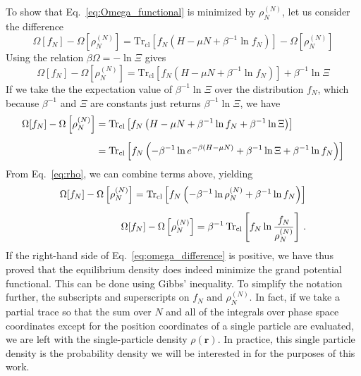 \documentclass{report}
\newcommand{\trace}{\operatorname{Tr_{cl}}}
\begin{document}
To show that Eq.~\ref{eq:Omega_functional} is minimized by \(\rho_N^{(N)}\), let us consider the difference
\begin{equation}
    \Omega[f_N] - \Omega\left[\rho_N^{(N)}\right] = \trace \left[f_N\left(H-\mu N + \beta^{-1}\ln f_N\right)\right] - \Omega\left[\rho_N^{(N)}\right]
\end{equation}
Using the relation \(\beta\Omega = -\ln\Xi \) gives
\begin{equation}
    \Omega[f_N] - \Omega\left[\rho_N^{(N)}\right] = \trace \left[f_N\left(H-\mu N + \beta^{-1}\ln f_N\right)\right] + \beta^{-1}\ln\Xi
\end{equation}
If we take the the expectation value of \(\beta^{-1}\ln\Xi \) over the distribution \(f_N \), which because \(\beta^{-1} \) and \( \Xi \) are constants just returns \(\beta^{-1}\ln\Xi \), we have
\begin{equation*}
    \setlength{\jot}{8pt}
    \begin{split}
    \Omega[f_N] - \Omega\left[\rho_N^{(N)}\right] &= \trace \left[f_N\left(H-\mu N + \beta^{-1}\ln f_N + \beta^{-1}\ln\Xi\right)\right] \\
    &= \trace \left[f_N\left(-\beta^{-1}\ln e^{-\beta(H-\mu N)} + \beta^{-1}\ln\Xi + \beta^{-1}\ln f_N \right)\right]
    \end{split}
\end{equation*}
From Eq.~\ref{eq:rho}, we can combine terms above, yielding
\begin{equation}
    \setlength{\jot}{8pt}
    \begin{split}
    \Omega[f_N] - \Omega\left[\rho_N^{(N)}\right] = \trace \left[f_N\left(-\beta^{-1}\ln \rho_N^{(N)} + \beta^{-1}\ln f_N \right)\right] \\
    \Omega[f_N] - \Omega\left[\rho_N^{(N)}\right] = \beta^{-1}\trace \left[f_N\ln \frac{f_N}{\rho_N^{(N)}}\right] \, .
    \end{split}
    \label{eq:omega_difference}
\end{equation}
If the right-hand side of Eq.~\ref{eq:omega_difference} is positive, we have thus proved that the equilibrium density does indeed minimize the grand potential functional. This can be done using Gibbs' inequality. To simplify the notation further, the subscripts and superscripts on $f_N$ and \(\rho_N^{(N)}\). In fact, if we take a partial trace so that the sum over \(N\) and all of the integrals over phase space coordinates except for the position coordinates of a single particle are evaluated, we are left with the single-particle density \(\rho(\mathbf{r})\). In practice, this single particle density is the probability density we will be interested in for the purposes of this work.
\end{document}

